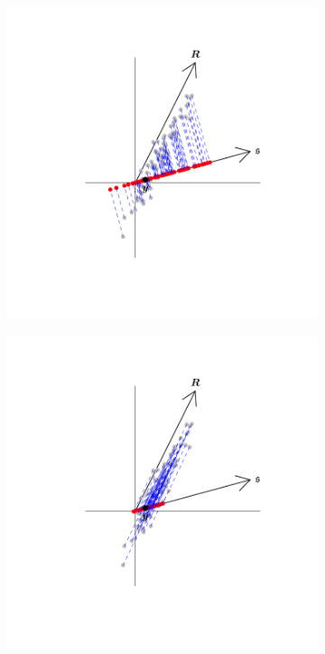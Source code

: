 \documentclass[12pt]{article}
\theoremstyle{definition}
\begin{document}
\begin{figure}[!p]
\begin{subfigure}[!h]{0.415\textwidth}
      \caption{}
  \end{subfigure}
  \begin{subfigure}[!h]{0.415\textwidth}
      \includegraphics[width=\textwidth]{Figs/OrthProj_George.pdf}
      \caption{}
  \end{subfigure}
  \begin{subfigure}[!h]{0.415\textwidth}
      \includegraphics[width=\textwidth]{Figs/ObliqProj_George.pdf}

\end{subfigure}
\end{figure}
\end{document}
